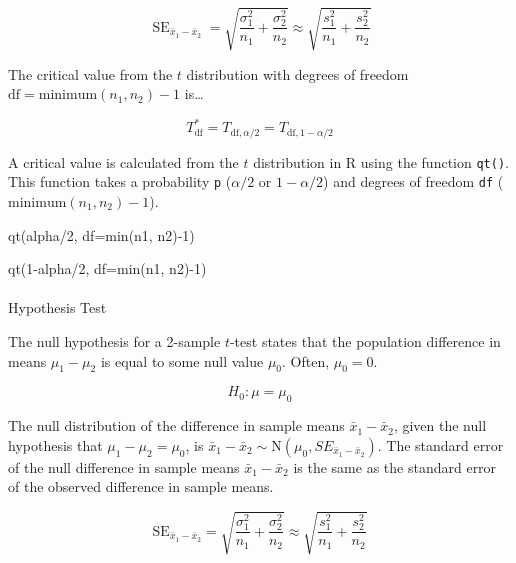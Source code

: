 \documentclass[
  letterpaper,
  DIV=11,
  numbers=noendperiod]{scrartcl}
\makeatletter
\let\oldparagraph\paragraph
\renewcommand{\paragraph}{
    \@ifstar
      \xxxParagraphStar
      \xxxParagraphNoStar
  }
\newcommand{\xxxParagraphStar}[1]{\oldparagraph*{#1}\mbox{}}
\newcommand{\xxxParagraphNoStar}[1]{\oldparagraph{#1}\mbox{}}
\newenvironment{Shaded}{\begin{snugshade}}{\end{snugshade}}
\newcommand{\AttributeTok}[1]{\textcolor[rgb]{0.40,0.45,0.13}{#1}}
\newcommand{\DecValTok}[1]{\textcolor[rgb]{0.68,0.00,0.00}{#1}}
\newcommand{\FunctionTok}[1]{\textcolor[rgb]{0.28,0.35,0.67}{#1}}
\newcommand{\NormalTok}[1]{\textcolor[rgb]{0.00,0.23,0.31}{#1}}
\newcommand{\SpecialCharTok}[1]{\textcolor[rgb]{0.37,0.37,0.37}{#1}}
\makeatother
\begin{document}
\[
\operatorname{SE}_{\bar{x}_1-\bar{x}_2}=  \sqrt{\frac{\sigma_1^2}{n_1}+\frac{\sigma_2^2}{n_2}} \approx \sqrt{\frac{s_1^2}{n_1}+\frac{s_2^2}{n_2}}
\]

The critical value from the \(t\) distribution with degrees of freedom
\(\text{df}=\text{minimum}(n_1, n_2)-1\) is\ldots{}

\[
T_{\text{df}}^*=T_{\text{df},\alpha/2}=T_{\text{df}, 1-\alpha/2}
\]

A critical value is calculated from the \(t\) distribution in R using
the function \texttt{qt()}. This function takes a probability \texttt{p}
(\(\alpha/2\) or \(1-\alpha/2\)) and degrees of freedom \texttt{df}
(\(\text{minimum}(n_1, n_2)-1\)).

\begin{Shaded}
\begin{Highlighting}[]
\FunctionTok{qt}\NormalTok{(alpha}\SpecialCharTok{/}\DecValTok{2}\NormalTok{, }\AttributeTok{df=}\FunctionTok{min}\NormalTok{(n1, n2)}\SpecialCharTok{{-}}\DecValTok{1}\NormalTok{)}

\FunctionTok{qt}\NormalTok{(}\DecValTok{1}\SpecialCharTok{{-}}\NormalTok{alpha}\SpecialCharTok{/}\DecValTok{2}\NormalTok{, }\AttributeTok{df=}\FunctionTok{min}\NormalTok{(n1, n2)}\SpecialCharTok{{-}}\DecValTok{1}\NormalTok{)}
\end{Highlighting}
\end{Shaded}

\paragraph{Hypothesis Test}\label{hypothesis-test-2}

The null hypothesis for a 2-sample \(t\)-test states that the population
difference in means \(\mu_1-\mu_2\) is equal to some null value
\(\mu_0\). Often, \(\mu_0=0\).

\[
H_0 \colon \mu=\mu_0
\]

The null distribution of the difference in sample means
\(\bar{x}_1-\bar{x}_2\), given the null hypothesis that
\(\mu_1-\mu_2=\mu_0\), is
\(\bar{x}_1-\bar{x}_2 \sim \text{N}\left(\mu_0, SE_{\bar{x}_1-\bar{x}_2}\right)\).
The standard error of the null difference in sample means
\(\bar{x}_1-\bar{x}_2\) is the same as the standard error of the
observed difference in sample means.

\[
\text{SE}_{\bar{x}_1-\bar{x}_2}=\sqrt{\frac{\sigma_1^2}{n_1}+\frac{\sigma_2^2}{n_2}} \approx \sqrt{\frac{s_1^2}{n_1}+\frac{s_2^2}{n_2}}
\]
\end{document}
